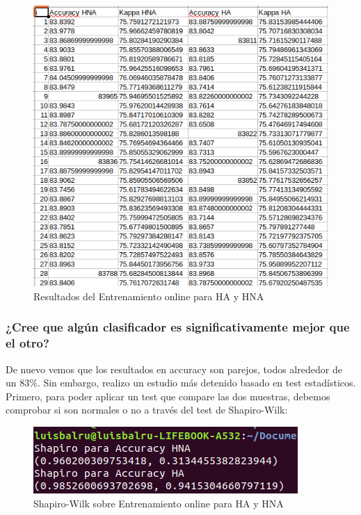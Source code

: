 \begin{figure}[H] %
	\centering
	\includegraphics[scale=0.4]{onl-res.png}  %
	\caption{Resultados del Entrenamiento online para HA y HNA} 
	\label{fig:onl2}
\end{figure}

\subsubsection{¿Cree que algún clasificador es significativamente mejor que el otro?}

De nuevo vemos que los resultados en accuracy son parejos, todos alrededor de un 83\%. Sin embargo, realizo un estudio más detenido basado en test estadísticos. Primero, para poder aplicar un test que compare las dos muestras, debemos comprobar si son normales o no a través del test de Shapiro-Wilk:

\begin{figure}[H] %
	\centering
	\includegraphics[scale=0.4]{onl3.png}  %
	\caption{Shapiro-Wilk sobre Entrenamiento online para HA y HNA} 
	\label{fig:onl3}
\end{figure}

